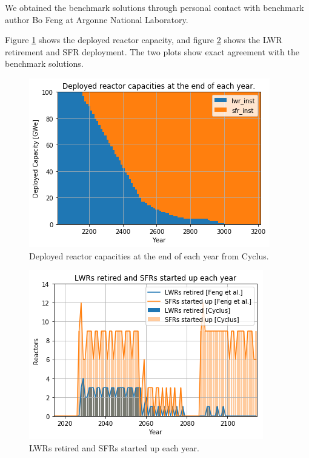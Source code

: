 We obtained the benchmark solutions through personal contact with
benchmark author Bo Feng at Argonne National Laboratory.

Figure \ref{fig:pow_plot} shows the deployed reactor capacity, and
figure \ref{fig:dep} shows the \gls{LWR} retirement and \gls{SFR}
deployment. The two plots show exact agreement with the
benchmark solutions.

\begin{figure}[htbp!]
	\begin{center}
		\includegraphics[scale=0.7]{./images/results_18/power_plot.png}
	\end{center}
	\caption{Deployed reactor capacities at the end of each year from Cyclus.}
	\label{fig:pow_plot}
\end{figure}


\begin{figure}[htbp!]
	\begin{center}
		\includegraphics[scale=0.7]{./images/results_18/dep.png}
	\end{center}
	\caption{\glspl{LWR} retired and \glspl{SFR} started up each year.}
	\label{fig:dep}
\end{figure}

